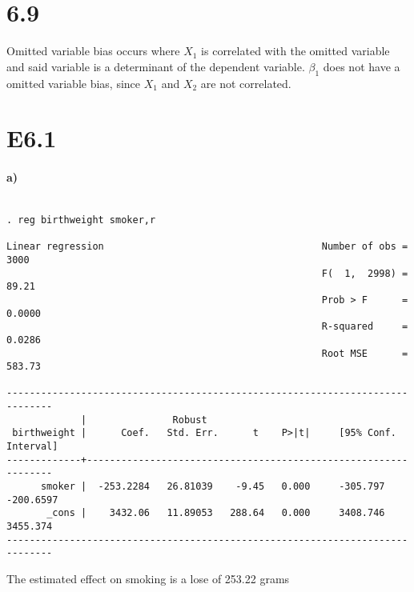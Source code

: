 \documentclass[letterpaper,12pt,titlepage,oneside,final]{book}
\begin{document}
\section*{6.9}
Omitted variable bias occurs where $X_1$ is correlated with the omitted variable and said variable is a determinant of the dependent variable. $\beta_1$ does not have a omitted variable bias, since $X_1$ and $X_2$ are not correlated.

\section*{E6.1}
\paragraph{a)}
\begin{verbatim}

. reg birthweight smoker,r

Linear regression                                      Number of obs =    3000
                                                       F(  1,  2998) =   89.21
                                                       Prob > F      =  0.0000
                                                       R-squared     =  0.0286
                                                       Root MSE      =  583.73

------------------------------------------------------------------------------
             |               Robust
 birthweight |      Coef.   Std. Err.      t    P>|t|     [95% Conf. Interval]
-------------+----------------------------------------------------------------
      smoker |  -253.2284   26.81039    -9.45   0.000     -305.797   -200.6597
       _cons |    3432.06   11.89053   288.64   0.000     3408.746    3455.374
------------------------------------------------------------------------------

\end{verbatim}
The estimated effect on smoking is a lose of 253.22 grams
\end{document}
